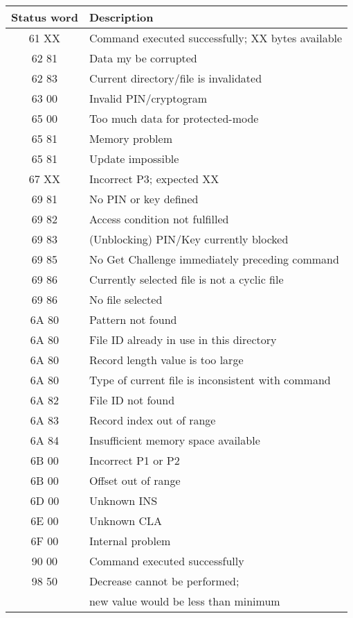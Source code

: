 \documentclass[a4paper,oneside]{article}
\begin{document}
\begin{center}
\begin{tabular}{|c|l|} \hline
Status word & Description \\ \hline \hline
61 XX & Command executed successfully; XX bytes available \\ \hline
62 81 & Data my be corrupted \\ \hline
62 83 & Current directory/file is invalidated \\ \hline
63 00 & Invalid PIN/cryptogram \\ \hline
65 00 & Too much data for protected-mode \\ \hline
65 81 & Memory problem \\ \hline
65 81 & Update impossible \\ \hline
67 XX & Incorrect P3; expected XX \\ \hline
69 81 & No PIN or key defined \\ \hline
69 82 & Access condition not fulfilled \\ \hline
69 83 & (Unblocking) PIN/Key currently blocked \\ \hline
69 85 & No Get Challenge immediately preceding command \\ \hline
69 86 & Currently selected file is not a cyclic file \\ \hline
69 86 & No file selected \\ \hline
6A 80 & Pattern not found \\ \hline
6A 80 & File ID already in use in this directory \\ \hline
6A 80 & Record length value is too large \\ \hline
6A 80 & Type of current file is inconsistent with command \\ \hline
6A 82 & File ID not found \\ \hline
6A 83 & Record index out of range \\ \hline
6A 84 & Insufficient memory space available \\ \hline
6B 00 & Incorrect P1 or P2 \\ \hline
6B 00 & Offset out of range \\ \hline
6D 00 & Unknown INS \\ \hline
6E 00 & Unknown CLA \\ \hline
6F 00 & Internal problem \\ \hline
90 00 & Command executed successfully \\ \hline
98 50 & Decrease cannot be performed; \\
      & new value would be less than minimum \\ \hline
\end{tabular}
\end{center}
\end{document}
